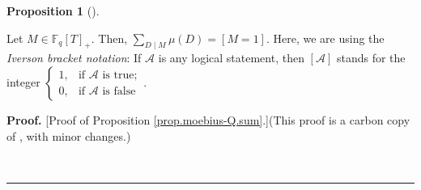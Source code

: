 \documentclass[numbers=enddot,12pt,final,onecolumn,notitlepage]{scrartcl}%
\theoremstyle{definition}
\newtheorem{prop}[theo]{Proposition}
\newenvironment{proposition}[1][]
{\begin{prop}[#1]\begin{leftbar}}
{\end{leftbar}\end{prop}}
\newenvironment{proof}[1][Proof]{\noindent\textbf{#1.} }{\ \rule{0.5em}{0.5em}}
\let\sumnonlimits\sum
\renewcommand{\sum}{\sumnonlimits\limits}
\begin{document}
\begin{proposition}
\label{prop.moebius-Q.sum}Let $M\in\mathbb{F}_{q}\left[  T\right]  _{+}$.
Then, $\sum_{D\mid M}\mu\left(  D\right)  =\left[  M=1\right]  $. Here, we are
using the \textit{Iverson bracket notation}: If $\mathcal{A}$ is any logical
statement, then $\left[  \mathcal{A}\right]  $ stands for the integer $%
\begin{cases}
1, & \text{if }\mathcal{A}\text{ is true};\\
0, & \text{if }\mathcal{A}\text{ is false}%
\end{cases}
$.
\end{proposition}

\begin{proof}
[Proof of Proposition \ref{prop.moebius-Q.sum}.](This proof is a carbon copy
of \cite[proof of (12.344)]{reiner-hopf}, with minor changes.)


\end{proof}
\end{document}
